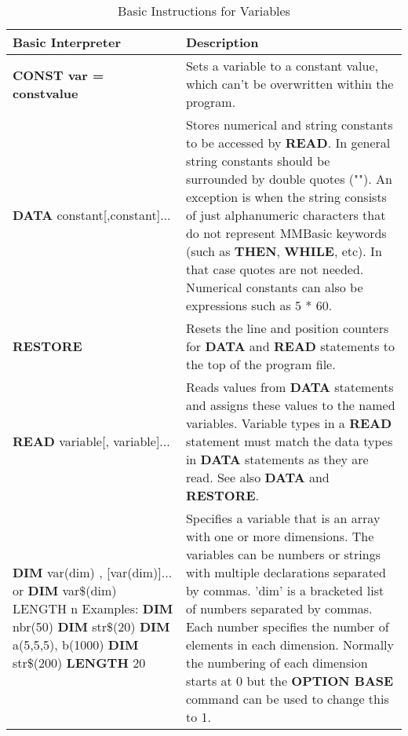 \begin{table}[]
\centering
\caption{Basic Instructions for Variables}
\label{Basic_Instructions_for_Variables}
\begin{tabular}{|p{4cm}|p{10cm}|}
\hline
\textbf{Basic Interpreter} & \textbf{Description}                                                   
\\ \hline
\textbf{CONST var = constvalue} & Sets a variable to a constant value, which can't be overwritten within the program.
\\ \hline
\textbf{DATA} constant[,constant]... & Stores numerical and string constants to be accessed by \textbf{READ}.
In general string constants should be surrounded by double quotes ("").\newline
An exception is when the string consists of just alphanumeric characters
that do not represent MMBasic keywords (such as \textbf{THEN}, \textbf{WHILE}, etc).
In that case quotes are not needed.\newline
Numerical constants can also be expressions such as 5 * 60.
\\ \hline
\textbf{RESTORE} & Resets the line and position counters for \textbf{DATA} and \textbf{READ} statements to the top of the program file.
\\ \hline
\textbf{READ} variable[, variable]...
& Reads values from \textbf{DATA} statements and assigns these values to the
named variables. Variable types in a \textbf{READ} statement must match the
data types in \textbf{DATA} statements as they are read. See also \textbf{DATA} and
\textbf{RESTORE}.
\\ \hline
\textbf{DIM} var(dim) , [var(dim)]...\newline
or
\textbf{DIM} var\$(dim) LENGTH n\newline
Examples:\newline
\textbf{DIM} nbr(50)\newline
\textbf{DIM} str\$(20)\newline
\textbf{DIM} a(5,5,5), b(1000)\newline
\textbf{DIM} str\$(200) \textbf{LENGTH} 20
&
Specifies a variable that is an array with one or more dimensions. The
variables can be numbers or strings with multiple declarations separated
by commas.\newline
'dim' is a bracketed list of numbers separated by commas. Each number
specifies the number of elements in each dimension. Normally the
numbering of each dimension starts at 0 but the \textbf{OPTION BASE}
command can be used to change this to 1.\newline

\end{tabular}
\end{table}
